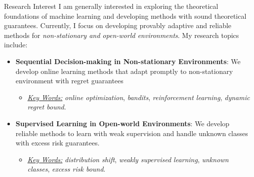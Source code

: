 \documentclass{resume} %
\begin{document}
\begin{rSection}{Research Interest}
I am generally interested in exploring the theoretical foundations of machine learning and developing methods with sound theoretical guarantees. Currently, I focus on developing provably adaptive and reliable methods for \emph{non-stationary and open-world environments}. My research topics include:
\begin{itemize}
	\item \textbf{Sequential Decision-making in Non-stationary Environments}: We develop online learning methods that adapt promptly to non-stationary environment with regret guarantees\vspace{-1mm}
	\begin{itemize}[label = {-}, left=- 2mm]
		\item \underline{\emph{Key Words:}} \emph{online optimization}, \emph{bandits}, \emph{reinforcement learning}, \emph{dynamic regret bound}.
	\end{itemize}\vspace{1.5mm}
	\item \textbf{Supervised Learning in Open-world Environments}: We develop reliable methods to learn with weak supervision and handle unknown classes with excess risk guarantees.\vspace{-1mm}
	\begin{itemize}[label = {-}, left = -2mm]
		\item \underline{\emph{Key Words:}} \emph{distribution shift}, \emph{weakly supervised learning}, \emph{unknown classes}, \emph{excess risk bound}. 
	\end{itemize}
\end{itemize}
\end{rSection}
\end{document}
